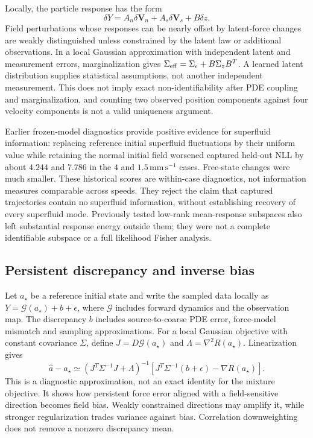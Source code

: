 \documentclass[11pt]{article}
\numberwithin{equation}{section}
\begin{document}
Locally, the particle response has the form
\begin{equation}
 \delta Y=A_n\delta\mathbf V_n+A_s\delta\mathbf V_s+B\delta z.
 \label{eq:localconfounding}
\end{equation}
Field perturbations whose responses can be nearly offset by latent-force changes are weakly distinguished unless constrained by the latent law or additional observations. In a local Gaussian approximation with independent latent and measurement errors, marginalization gives $\Sigma_{\rm eff}=\Sigma_\epsilon+B\Sigma_zB^T$. A learned latent distribution supplies statistical assumptions, not another independent measurement. This does not imply exact non-identifiability after PDE coupling and marginalization, and counting two observed position components against four velocity components is not a valid uniqueness argument.

Earlier frozen-model diagnostics provide positive evidence for superfluid information: replacing reference initial superfluid fluctuations by their uniform value while retaining the normal initial field worsened captured held-out NLL by about $4.244$ and $7.786$ in the $4$ and $1.5\,\mathrm{mm\,s^{-1}}$ cases. Free-state changes were much smaller. These historical scores are within-case diagnostics, not information measures comparable across speeds. They reject the claim that captured trajectories contain no superfluid information, without establishing recovery of every superfluid mode. Previously tested low-rank mean-response subspaces also left substantial response energy outside them; they were not a complete identifiable subspace or a full likelihood Fisher analysis.

\subsection{Persistent discrepancy and inverse bias}

Let $a_\star$ be a reference initial state and write the sampled data locally as $Y=\mathcal G(a_\star)+b+\epsilon$, where $\mathcal G$ includes forward dynamics and the observation map. The discrepancy $b$ includes source-to-coarse PDE error, force-model mismatch and sampling approximations. For a local Gaussian objective with constant covariance $\Sigma$, define $J=D\mathcal G(a_\star)$ and $\Lambda=\nabla^2R(a_\star)$. Linearization gives
\begin{equation}
 \widehat a-a_\star\simeq
 (J^T\Sigma^{-1}J+\Lambda)^{-1}
 \left[J^T\Sigma^{-1}(b+\epsilon)-\nabla R(a_\star)\right].
 \label{eq:biaslinearization}
\end{equation}
This is a diagnostic approximation, not an exact identity for the mixture objective. It shows how persistent force error aligned with a field-sensitive direction becomes field bias. Weakly constrained directions may amplify it, while stronger regularization trades variance against bias. Correlation downweighting does not remove a nonzero discrepancy mean.
\end{document}
